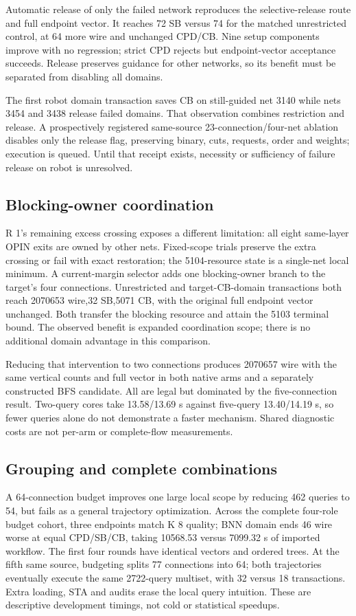 \documentclass[conference,10pt]{IEEEtran}
\begin{document}
Automatic release of only the failed network reproduces the selective-release route and full endpoint vector. It reaches 72 SB versus 74 for the matched unrestricted control, at 64 more wire and unchanged CPD/CB. Nine setup components improve with no regression; strict CPD rejects but endpoint-vector acceptance succeeds. Release preserves guidance for other networks, so its benefit must be separated from disabling all domains.

The first robot domain transaction saves CB on still-guided net 3140 while nets 3454 and 3438 release failed domains. That observation combines restriction and release. A prospectively registered same-source 23-connection/four-net ablation disables only the release flag, preserving binary, cuts, requests, order and weights; execution is queued. Until that receipt exists, necessity or sufficiency of failure release on robot is unresolved.

\subsection{Blocking-owner coordination}
R 1's remaining excess crossing exposes a different limitation: all eight same-layer OPIN exits are owned by other nets. Fixed-scope trials preserve the extra crossing or fail with exact restoration; the 5104-resource state is a single-net local minimum. A current-margin selector adds one blocking-owner branch to the target's four connections. Unrestricted and target-CB-domain transactions both reach 2070653 wire,32 SB,5071 CB, with the original full endpoint vector unchanged. Both transfer the blocking resource and attain the 5103 terminal bound. The observed benefit is expanded coordination scope; there is no additional domain advantage in this comparison.

Reducing that intervention to two connections produces 2070657 wire with the same vertical counts and full vector in both native arms and a separately constructed BFS candidate. All are legal but dominated by the five-connection result. Two-query cores take 13.58/13.69 s against five-query 13.40/14.19 s, so fewer queries alone do not demonstrate a faster mechanism. Shared diagnostic costs are not per-arm or complete-flow measurements.

\subsection{Grouping and complete combinations}
A 64-connection budget improves one large local scope by reducing 462 queries to 54, but fails as a general trajectory optimization. Across the complete four-role budget cohort, three endpoints match K 8 quality; BNN domain ends 46 wire worse at equal CPD/SB/CB, taking 10568.53 versus 7099.32 s of imported workflow. The first four rounds have identical vectors and ordered trees. At the fifth same source, budgeting splits 77 connections into 64; both trajectories eventually execute the same 2722-query multiset, with 32 versus 18 transactions. Extra loading, STA and audits erase the local query intuition. These are descriptive development timings, not cold or statistical speedups.
\end{document}
